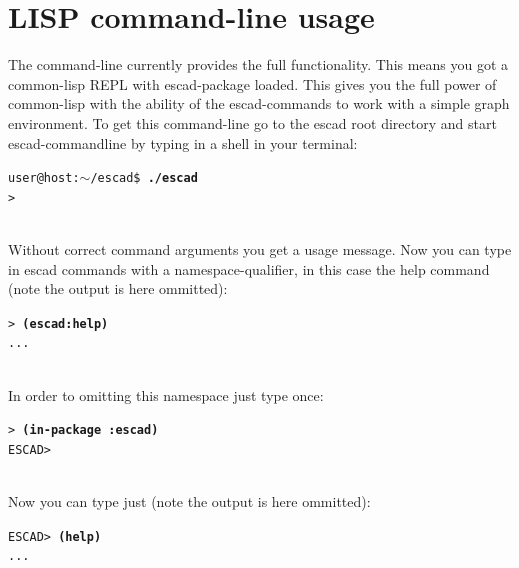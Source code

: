 \documentclass[a4paper, 12pt, openany]{scrbook}
\makeatletter
\newcommand{\shellcmdline}[2]{\\
  \setlength{\fboxsep}{2pt}\colorbox{black!20}{\parbox{\textwidth}{\texttt{user@host:$\sim$/escad\$ \textbf{#1}\\#2}}}\\}
\newcommand{\escadcmdline}[2]{\\\setlength{\fboxsep}{2pt}\colorbox{black!20}{\parbox{\textwidth}{\texttt{ESCAD> \textbf{#1}\\#2}}}\\}
\newcommand{\lispcmdline}[2]{\\\setlength{\fboxsep}{2pt}\colorbox{black!20}{\parbox{\textwidth}{\texttt{> \textbf{#1}\\#2}}}\\}
\makeatother
\begin{document}
\section{LISP command-line usage}\label{sec:cmd_line}
The command-line currently provides the full functionality. This means you got a common-lisp REPL with escad-package loaded. This gives you the full power of common-lisp with the ability of the escad-commands to work with a simple graph environment. To get this command-line go to the escad root directory and start escad-commandline by typing in a shell in your terminal:
\shellcmdline{./escad}{>}
Without correct command arguments you get a usage message.
Now you can type in escad commands with a namespace-qualifier, in this case the help command (note the output is here ommitted):
\lispcmdline{(escad:help)}{...}
In order to omitting this namespace just type once:
\lispcmdline{(in-package :escad)}{ESCAD>}
Now you can type just (note the output is here ommitted):
\escadcmdline{(help)}{...}
\end{document}
